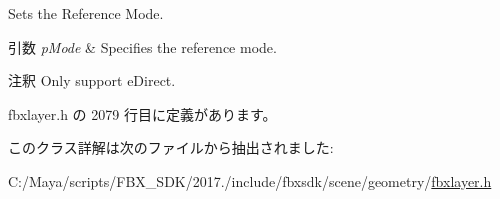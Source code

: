 Sets the Reference Mode. 
\begin{DoxyParams}{引数}
{\em p\+Mode} & Specifies the reference mode. \\
\hline
\end{DoxyParams}
\begin{DoxyRemark}{注釈}
Only support e\+Direct. 
\end{DoxyRemark}


 fbxlayer.\+h の 2079 行目に定義があります。



このクラス詳解は次のファイルから抽出されました\+:\begin{DoxyCompactItemize}
\item 
C\+:/\+Maya/scripts/\+F\+B\+X\+\_\+\+S\+D\+K/2017./include/fbxsdk/scene/geometry/\hyperlink{fbxlayer_8h}{fbxlayer.\+h}\end{DoxyCompactItemize}
